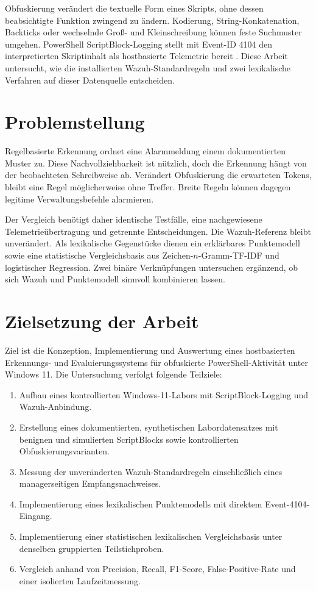 \documentclass[12pt,a4paper,oneside,parskip=half]{scrreprt}
\begin{document}
Obfuskierung verändert die textuelle Form eines Skripts, ohne dessen beabsichtigte Funktion zwingend zu ändern. Kodierung, String-Konkatenation, Backticks oder wechselnde Groß- und Kleinschreibung können feste Suchmuster umgehen. PowerShell ScriptBlock-Logging stellt mit Event-ID 4104 den interpretierten Skriptinhalt als hostbasierte Telemetrie bereit \cite{microsoft-logging}. Diese Arbeit untersucht, wie die installierten Wazuh-Standardregeln und zwei lexikalische Verfahren auf dieser Datenquelle entscheiden.

\section{Problemstellung}
Regelbasierte Erkennung ordnet eine Alarmmeldung einem dokumentierten Muster zu. Diese Nachvollziehbarkeit ist nützlich, doch die Erkennung hängt von der beobachteten Schreibweise ab. Verändert Obfuskierung die erwarteten Tokens, bleibt eine Regel möglicherweise ohne Treffer. Breite Regeln können dagegen legitime Verwaltungsbefehle alarmieren.

Der Vergleich benötigt daher identische Testfälle, eine nachgewiesene Telemetrieübertragung und getrennte Entscheidungen. Die Wazuh-Referenz bleibt unverändert. Als lexikalische Gegenstücke dienen ein erklärbares Punktemodell sowie eine statistische Vergleichsbasis aus Zeichen-\(n\)-Gramm-TF-IDF und logistischer Regression. Zwei binäre Verknüpfungen untersuchen ergänzend, ob sich Wazuh und Punktemodell sinnvoll kombinieren lassen.

\section{Zielsetzung der Arbeit}
Ziel ist die Konzeption, Implementierung und Auswertung eines hostbasierten Erkennungs- und Evaluierungssystems für obfuskierte PowerShell-Aktivität unter Windows 11. Die Untersuchung verfolgt folgende Teilziele:
\begin{enumerate}[label=Z\arabic*]
    \item Aufbau eines kontrollierten Windows-11-Labors mit ScriptBlock-Logging und Wazuh-Anbindung.
    \item Erstellung eines dokumentierten, synthetischen Labordatensatzes mit benignen und simulierten ScriptBlocks sowie kontrollierten Obfuskierungsvarianten.
    \item Messung der unveränderten Wazuh-Standardregeln einschließlich eines managerseitigen Empfangsnachweises.
    \item Implementierung eines lexikalischen Punktemodells mit direktem Event-4104-Eingang.
    \item Implementierung einer statistischen lexikalischen Vergleichsbasis unter denselben gruppierten Teilstichproben.
    \item Vergleich anhand von Precision, Recall, F1-Score, False-Positive-Rate und einer isolierten Laufzeitmessung.
\end{enumerate}
\end{document}
